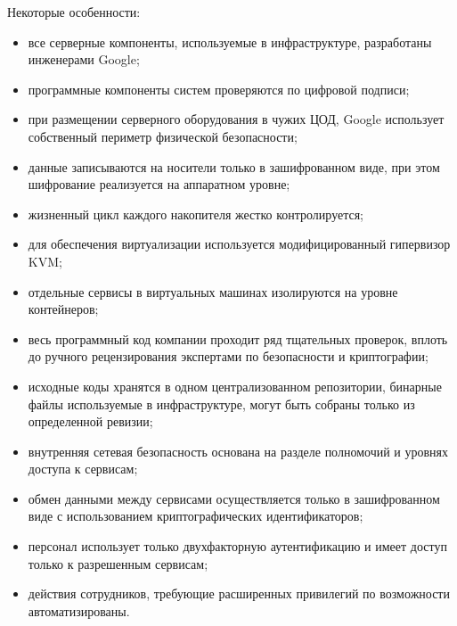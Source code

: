 Некоторые особенности:
\begin{itemize}
  \item все серверные компоненты, используемые в инфраструктуре, разработаны инженерами Google;
  \item программные компоненты систем проверяются по цифровой подписи;
  \item при размещении серверного оборудования в чужих ЦОД, Google использует собственный периметр физической безопасности;
  \item данные записываются на носители только в зашифрованном виде, при этом шифрование реализуется на аппаратном уровне;
  \item жизненный цикл каждого накопителя жестко контролируется;
  \item для обеспечения виртуализации используется модифицированный гипервизор KVM;
  \item отдельные сервисы в виртуальных машинах изолируются на уровне контейнеров;
  \item весь программный код компании проходит ряд тщательных проверок, вплоть до ручного рецензирования экспертами по безопасности и криптографии;
  \item исходные коды хранятся в одном централизованном репозитории, бинарные файлы используемые в инфраструктуре, могут быть собраны только из определенной ревизии;
  \item внутренняя сетевая безопасность основана на разделе полномочий и уровнях доступа к сервисам;
  \item обмен данными между сервисами осуществляется только в зашифрованном виде с использованием криптографических идентификаторов;
  \item персонал использует только двухфакторную аутентификацию и имеет доступ только к разрешенным сервисам;
  \item действия сотрудников, требующие расширенных привилегий по возможности автоматизированы.
\end{itemize}

\clearpage
